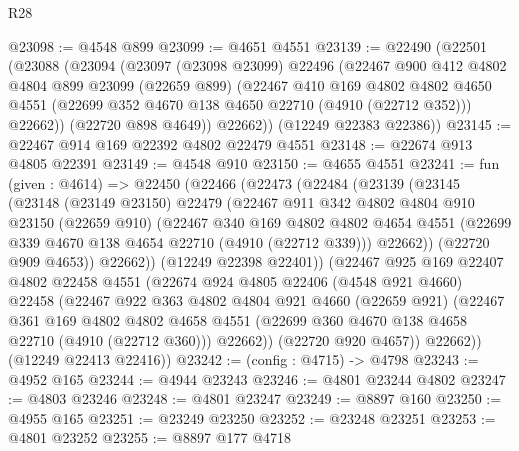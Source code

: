 \begin{lexlean}{R28}
\begin{coremodule}
@23098 := @4548 @899
@23099 := @4651 @4551
@23139 := @22490
    (@22501
      (@23088
        (@23094
          (@23097
            (@23098 @23099)
            @22496
            (@22467
              @900
              @412
              @4802
              @4804
              @899
              @23099
              (@22659 @899)
              (@22467
                @410
                @169
                @4802
                @4802
                @4650
                @4551
                (@22699 @352 @4670 @138 @4650 @22710 (@4910 (@22712 @352)))
                @22662))
            (@22720 @898 @4649))
          @22662))
      (@12249 @22383 @22386))
@23145 := @22467 @914 @169 @22392 @4802 @22479 @4551
@23148 := @22674 @913 @4805 @22391
@23149 := @4548 @910
@23150 := @4655 @4551
@23241 := fun (given : @4614) =>
  @22450
    (@22466
      (@22473
        (@22484
          (@23139
            (@23145
              (@23148
                (@23149 @23150)
                @22479
                (@22467
                  @911
                  @342
                  @4802
                  @4804
                  @910
                  @23150
                  (@22659 @910)
                  (@22467
                    @340
                    @169
                    @4802
                    @4802
                    @4654
                    @4551
                    (@22699 @339 @4670 @138 @4654 @22710 (@4910 (@22712 @339)))
                    @22662))
                (@22720 @909 @4653))
              @22662))
          (@12249 @22398 @22401))
        (@22467
          @925
          @169
          @22407
          @4802
          @22458
          @4551
          (@22674
            @924
            @4805
            @22406
            (@4548 @921 @4660)
            @22458
            (@22467
              @922
              @363
              @4802
              @4804
              @921
              @4660
              (@22659 @921)
              (@22467
                @361
                @169
                @4802
                @4802
                @4658
                @4551
                (@22699 @360 @4670 @138 @4658 @22710 (@4910 (@22712 @360)))
                @22662))
            (@22720 @920 @4657))
          @22662))
      (@12249 @22413 @22416))
@23242 := (config : @4715) -> @4798
@23243 := @4952 @165
@23244 := @4944 @23243
@23246 := @4801 @23244 @4802
@23247 := @4803 @23246
@23248 := @4801 @23247
@23249 := @8897 @160
@23250 := @4955 @165
@23251 := @23249 @23250
@23252 := @23248 @23251
@23253 := @4801 @23252
@23255 := @8897 @177 @4718

\end{coremodule}
\end{lexlean}
